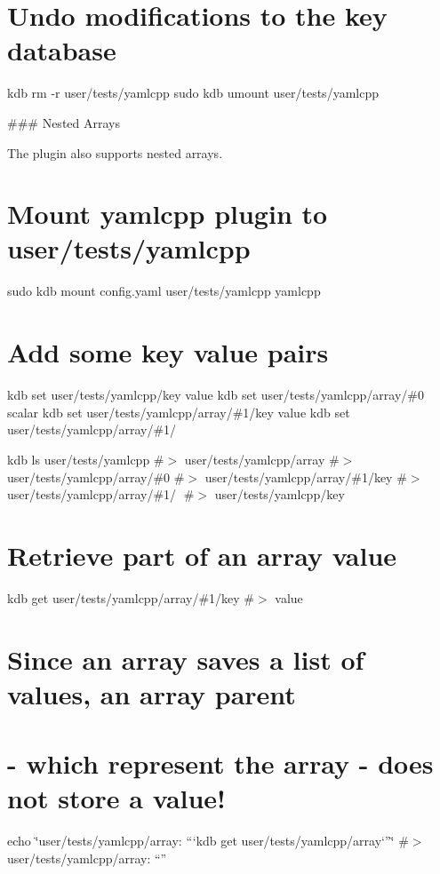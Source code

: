 \section*{Undo modifications to the key database}

kdb rm -\/r user/tests/yamlcpp sudo kdb umount user/tests/yamlcpp 
\begin{DoxyCode}
### Nested Arrays

The plugin also supports nested arrays.
\end{DoxyCode}
 \section*{Mount yamlcpp plugin to {\ttfamily user/tests/yamlcpp}}

sudo kdb mount config.\+yaml user/tests/yamlcpp yamlcpp

\section*{Add some key value pairs}

kdb set user/tests/yamlcpp/key value kdb set user/tests/yamlcpp/array/\#0 scalar kdb set user/tests/yamlcpp/array/\#1/key value kdb set user/tests/yamlcpp/array/\#1/🔑 🙈

kdb ls user/tests/yamlcpp \#$>$ user/tests/yamlcpp/array \#$>$ user/tests/yamlcpp/array/\#0 \#$>$ user/tests/yamlcpp/array/\#1/key \#$>$ user/tests/yamlcpp/array/\#1/🔑 \#$>$ user/tests/yamlcpp/key

\section*{Retrieve part of an array value}

kdb get user/tests/yamlcpp/array/\#1/key \#$>$ value

\section*{Since an array saves a list of values, an array parent}

\section*{-\/ which represent the array -\/ does not store a value!}

echo \char`\"{}user/tests/yamlcpp/array\+: “`kdb get user/tests/yamlcpp/array`”\char`\"{} \#$>$ user/tests/yamlcpp/array\+: “”

